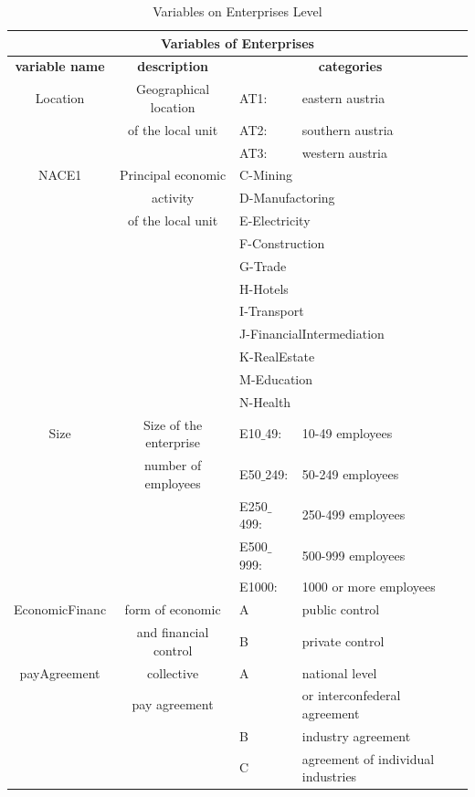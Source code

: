 \documentclass[12pt]{article}
\begin{document}
\begin{table}%
\caption{Variables on Enterprises Level}
\begin{center}
\begin{tabular}{|c|c|l l|}
\hline \multicolumn{4}{|c|}{\textbf{Variables of Enterprises}} \\ 
\hline \textbf{variable name} & \textbf{description} & \multicolumn{2}{|c|}{\textbf{categories}} \\
\hline Location & Geographical location & AT1:& eastern austria  \\
& of the local unit &  AT2: & southern austria \\
&& AT3: & western austria \\
\hline NACE1 & Principal economic & \multicolumn{2}{|l|}{C-Mining}  \\
& activity  & \multicolumn{2}{|l|}{D-Manufactoring} \\
& of the local unit & \multicolumn{2}{|l|}{E-Electricity} \\
&& \multicolumn{2}{|l|}{F-Construction} \\
&& \multicolumn{2}{|l|}{G-Trade} \\
&& \multicolumn{2}{|l|}{H-Hotels} \\ 
&& \multicolumn{2}{|l|}{I-Transport} \\
&& \multicolumn{2}{|l|}{J-FinancialIntermediation} \\
&& \multicolumn{2}{|l|}{K-RealEstate} \\
&& \multicolumn{2}{|l|}{M-Education} \\ 
&& \multicolumn{2}{|l|}{N-Health} \\
\hline Size & Size of the enterprise & E10$\_$49: & 10-49 employees \\
& number of employees & E50$\_$249: & 50-249  employees \\
&& E250$\_$499: & 250-499 employees\\
&& E500$\_$999: & 500-999 employees \\
&& E1000:  & 1000 or more employees \\
\hline EconomicFinanc & form of economic & A & public control \\
& and financial control & B & private control  \\
\hline payAgreement & collective & A & national level  \\ 
& pay agreement && or interconfederal agreement\\
&  & B & industry agreement \\
&& C & agreement of individual industries \\

\end{tabular}
\end{center}
\end{table}
\end{document}
